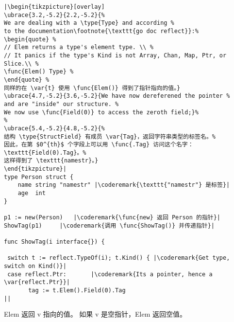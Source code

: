 \begin{lstlisting}[caption=使用反射自省,label=src:introspection]
|\begin{tikzpicture}[overlay]
\ubrace{3.2,-5.2}{2.2,-5.2}{%
We are dealing with a \type{Type} and according %
to the documentation\footnote{\texttt{go doc reflect}}:%
\begin{quote} %
// Elem returns a type's element type. \\ %
// It panics if the type's Kind is not Array, Chan, Map, Ptr, or Slice.\\ %
\func{Elem() Type} %
\end{quote} %
同样的在 \var{t} 使用 \func{Elem()} 得到了指针指向的值。}
\ubrace{4.7,-5.2}{3.6,-5.2}{We have now dereferened the pointer %
and are "inside" our structure. %
We now use \func{Field(0)} to access the zeroth field;}%
%
\ubrace{5.4,-5.2}{4.8,-5.2}{%
结构 \type{StructField} 有成员 \var{Tag}，返回字符串类型的标签名。%
因此，在第 $0^{th}$ 个字段上可以用 \func{.Tag} 访问这个名字：\texttt{Field(0).Tag}。%
这样得到了 \texttt{namestr}。}
\end{tikzpicture}|
type Person struct {
    name string "namestr" |\coderemark{\texttt{"namestr"} 是标签}|
    age  int
}

p1 := new(Person)   |\coderemark{\func{new} 返回 Person 的指针}|
ShowTag(p1)	    |\coderemark{调用 \func{ShowTag()} 并传递指针}|

func ShowTag(i interface{}) {

 switch t := reflect.TypeOf(i); t.Kind() { |\coderemark{Get type, switch on Kind()}|
 case reflect.Ptr:       |\coderemark{Its a pointer, hence a \var{reflect.Ptr}}|
       tag := t.Elem().Field(0).Tag
||
\end{lstlisting}
Elem 返回 v 指向的值。%
如果 v 是空指针，Elem 返回空值。%

